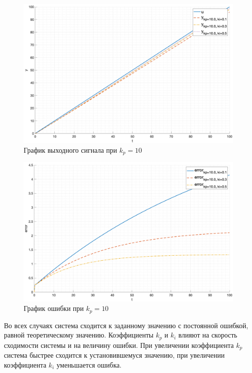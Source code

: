 \begin{figure}[ht!]
    \centering
    \includegraphics[width=\textwidth]{media/plots/task5_out_kp_10.0_1.png}
    \caption{График выходного сигнала при $k_p = 10$}
    \label{fig:task5_out3}
\end{figure}

\begin{figure}[ht!]
    \centering
    \includegraphics[width=\textwidth]{media/plots/task5_error_kp_10.0_1.png}
    \caption{График ошибки при $k_p = 10$}
    \label{fig:task5_error3}
\end{figure}

Во всех случаях система сходится к заданному значению с постоянной ошибкой, равной теоретическому значению.
Коэффициенты $k_p$ и $k_i$ влияют на скорость сходимости системы и на величину ошибки. 
При увеличении коэффициента $k_p$ система быстрее сходится к установившемуся значению,
при увеличении коэффициента $k_i$ уменьшается ошибка.

